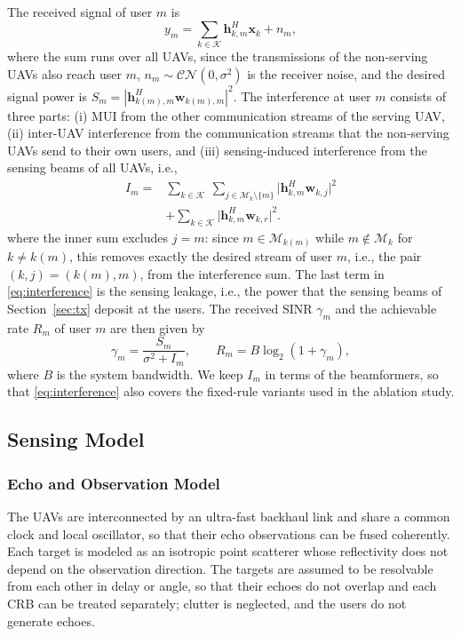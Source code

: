 \documentclass[conference]{IEEEtran}
\begin{document}
The received signal of user $m$ is
\begin{equation}
y_m=\sum_{k\in\mathcal K}\mathbf h_{k,m}^H\mathbf x_k+n_m,
\end{equation}
where the sum runs over all UAVs, since the transmissions of the non-serving UAVs also reach user $m$, $n_m\sim\mathcal{CN}(0,\sigma^2)$ is the receiver noise, and the desired signal power is $S_m=|\mathbf h_{k(m),m}^H\mathbf w_{k(m),m}|^2$. The interference at user $m$ consists of three parts: (i) MUI from the other communication streams of the serving UAV, (ii) inter-UAV interference from the communication streams that the non-serving UAVs send to their own users, and (iii) sensing-induced interference from the sensing beams of all UAVs, i.e.,
\begin{equation}\label{eq:interference}
\begin{aligned}
I_m={}&\sum_{k\in\mathcal K}\ \sum_{j\in\mathcal M_k\setminus\{m\}}\big|\mathbf h_{k,m}^H\mathbf w_{k,j}\big|^2\\
&+\sum_{k\in\mathcal K}\big|\mathbf h_{k,m}^H\mathbf w_{k,r}\big|^2.
\end{aligned}
\end{equation}
where the inner sum excludes $j=m$: since $m\in\mathcal M_{k(m)}$ while $m\notin\mathcal M_k$ for $k\neq k(m)$, this removes exactly the desired stream of user $m$, i.e., the pair $(k,j)=(k(m),m)$, from the interference sum. The last term in \eqref{eq:interference} is the sensing leakage, i.e., the power that the sensing beams of Section~\ref{sec:tx} deposit at the users.
The received SINR $\gamma_m$ and the achievable rate $R_m$ of user $m$ are then given by
\begin{equation}
\gamma_m=\frac{S_m}{\sigma^2+I_m},\qquad R_m=B\log_2(1+\gamma_m),
\end{equation}
where $B$ is the system bandwidth. We keep $I_m$ in terms of the beamformers, so that \eqref{eq:interference} also covers the fixed-rule variants used in the ablation study.

\subsection{Sensing Model}

\subsubsection{Echo and Observation Model}

The UAVs are interconnected by an ultra-fast backhaul link and share a common clock and local oscillator, so that their echo observations can be fused coherently. Each target is modeled as an isotropic point scatterer whose reflectivity does not depend on the observation direction. The targets are assumed to be resolvable from each other in delay or angle, so that their echoes do not overlap and each CRB can be treated separately; clutter is neglected, and the users do not generate echoes.
\end{document}
